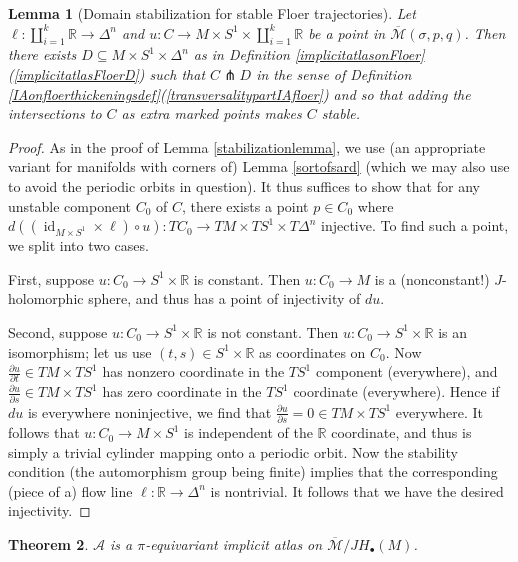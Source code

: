 \documentclass[12pt]{article}
\newtheorem{theorem}{Theorem}[subsection]
\newtheorem{lemma}[theorem]{Lemma}
\theoremstyle{definition}
\theoremstyle{remark}
\numberwithin{equation}{subsection}
\newcommand{\RR}{\mathbb R}
\newcommand{\A}{\mathcal A}
\newcommand{\Mbar}{\overline{\mathcal M}}
\newcommand{\id}{\operatorname{id}}
\newcommand{\JH}{J\!H}
\begin{document}
\begin{lemma}[Domain stabilization for stable Floer trajectories]\label{stabilizationlemmaforHF}
Let $\ell:\coprod_{i=1}^k\RR\to\Delta^n$ and $u:C\to M\times S^1\times\coprod_{i=1}^k\RR$ be a point in $\Mbar(\sigma,p,q)$.  Then there exists $D\subseteq M\times S^1\times\Delta^n$ as in Definition \ref{implicitatlasonFloer}(\ref{implicitatlasFloerD}) such that $C\pitchfork D$ in the sense of Definition \ref{IAonfloerthickeningsdef}(\ref{transversalitypartIAfloer}) and so that adding the intersections to $C$ as extra marked points makes $C$ stable.
\end{lemma}

\begin{proof}
As in the proof of Lemma \ref{stabilizationlemma}, we use (an appropriate variant for manifolds with corners of) Lemma \ref{sortofsard} (which we may also use to avoid the periodic orbits in question).  It thus suffices to show that for any unstable component $C_0$ of $C$, there exists a point $p\in C_0$ where $d((\id_{M\times S^1}\times\ell)\circ u):TC_0\to TM\times TS^1\times T\Delta^n$ injective.  To find such a point, we split into two cases.

First, suppose $u:C_0\to S^1\times\RR$ is constant.  Then $u:C_0\to M$ is a (nonconstant!) $J$-holomorphic sphere, and thus has a point of injectivity of $du$.

Second, suppose $u:C_0\to S^1\times\RR$ is not constant.  Then $u:C_0\to S^1\times\RR$ is an isomorphism; let us use $(t,s)\in S^1\times\RR$ as coordinates on $C_0$.  Now $\frac{\partial u}{\partial t}\in TM\times TS^1$ has nonzero coordinate in the $TS^1$ component (everywhere), and $\frac{\partial u}{\partial s}\in TM\times TS^1$ has zero coordinate in the $TS^1$ coordinate (everywhere).  Hence if $du$ is everywhere noninjective, we find that $\frac{\partial u}{\partial s}=0\in TM\times TS^1$ everywhere.  It follows that $u:C_0\to M\times S^1$ is independent of the $\RR$ coordinate, and thus is simply a trivial cylinder mapping onto a periodic orbit.  Now the stability condition (the automorphism group being finite) implies that the corresponding (piece of a) flow line $\ell:\RR\to\Delta^n$ is nontrivial.  It follows that we have the desired injectivity.
\end{proof}

\begin{theorem}\label{IAonFloerworks}
$\A$ is a $\pi$-equivariant implicit atlas on $\Mbar/\JH_\bullet(M)$.
\end{theorem}
\end{document}
